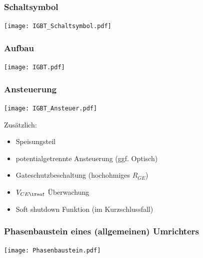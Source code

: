 \documentclass[fs, german]{latex4ei_fs}
\begin{document}
\begin{sectionbox}

\subsubsection*{Schaltsymbol}
\begin{center}
\texttt{[image: IGBT\_Schaltsymbol.pdf]}

\end{center}
\end{sectionbox}
\begin{sectionbox}


\subsubsection*{Aufbau}
\texttt{[image: IGBT.pdf]}
\end{sectionbox}
\begin{sectionbox}
\subsubsection*{Ansteuerung}
\texttt{[image: IGBT\_Ansteuer.pdf]}


Zusätzlich:
\begin{itemize}
	\item Speisungsteil
	\item potentialgetrennte Ansteuerung (ggf. Optisch)
	\item Gateschutzbeschaltung (hochohmiges $R_{GE}$)
	\item $V_{CE \ir sat}$ Überwachung
	\item Soft shutdown Funktion (im Kurzschlussfall)
\end{itemize}
\end{sectionbox}

\begin{sectionbox}
\subsubsection*{Phasenbaustein eines (allgemeinen) Umrichters}
\texttt{[image: Phasenbaustein.pdf]}

\end{sectionbox}
\end{document}
